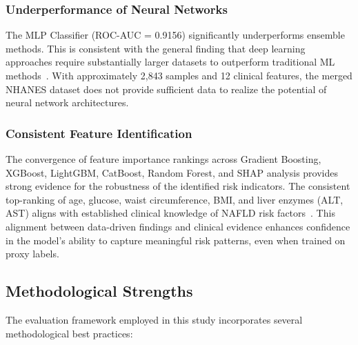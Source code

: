 \documentclass[conference,10pt]{IEEEtran}
\begin{document}
\subsubsection{Underperformance of Neural Networks}

The MLP Classifier (ROC-AUC = 0.9156) significantly underperforms ensemble methods. This is consistent with the general finding that deep learning approaches require substantially larger datasets to outperform traditional ML methods~\cite{shwartz2017opening}. With approximately 2,843 samples and 12 clinical features, the merged NHANES dataset does not provide sufficient data to realize the potential of neural network architectures.

\subsubsection{Consistent Feature Identification}

The convergence of feature importance rankings across Gradient Boosting, XGBoost, LightGBM, CatBoost, Random Forest, and SHAP analysis provides strong evidence for the robustness of the identified risk indicators. The consistent top-ranking of age, glucose, waist circumference, BMI, and liver enzymes (ALT, AST) aligns with established clinical knowledge of NAFLD risk factors~\cite{younossi2016global, chalasani2018diagnosis}. This alignment between data-driven findings and clinical evidence enhances confidence in the model's ability to capture meaningful risk patterns, even when trained on proxy labels.

\subsection{Methodological Strengths}

The evaluation framework employed in this study incorporates several methodological best practices:
\end{document}
